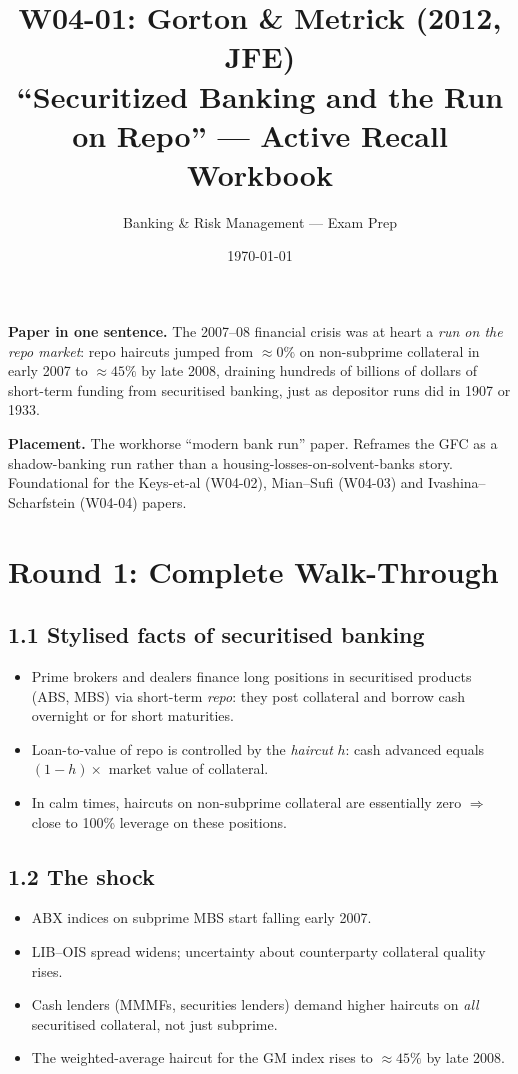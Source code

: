 \documentclass[11pt]{article}
\title{W04-01: Gorton \& Metrick (2012, JFE) \\
\large ``Securitized Banking and the Run on Repo'' --- Active Recall Workbook}
\author{Banking \& Risk Management --- Exam Prep}
\date{\today}
\begin{document}
\maketitle

\begin{keybox}
\textbf{Paper in one sentence.} The 2007--08 financial crisis was at heart a \emph{run on the repo market}: repo haircuts jumped from $\approx 0\%$ on non-subprime collateral in early 2007 to $\approx 45\%$ by late 2008, draining hundreds of billions of dollars of short-term funding from securitised banking, just as depositor runs did in 1907 or 1933.

\textbf{Placement.} The workhorse ``modern bank run'' paper. Reframes the GFC as a shadow-banking run rather than a housing-losses-on-solvent-banks story. Foundational for the Keys-et-al (W04-02), Mian--Sufi (W04-03) and Ivashina--Scharfstein (W04-04) papers.
\end{keybox}

\section*{Round 1: Complete Walk-Through}

\subsection*{1.1 Stylised facts of securitised banking}
\begin{itemize}
\item Prime brokers and dealers finance long positions in securitised products (ABS, MBS) via short-term \emph{repo}: they post collateral and borrow cash overnight or for short maturities.
\item Loan-to-value of repo is controlled by the \emph{haircut} $h$: cash advanced equals $(1-h)\times$ market value of collateral.
\item In calm times, haircuts on non-subprime collateral are essentially zero $\Rightarrow$ close to 100\% leverage on these positions.
\end{itemize}

\subsection*{1.2 The shock}
\begin{itemize}
\item ABX indices on subprime MBS start falling early 2007.
\item LIB--OIS spread widens; uncertainty about counterparty collateral quality rises.
\item Cash lenders (MMMFs, securities lenders) demand higher haircuts on \emph{all} securitised collateral, not just subprime.
\item The weighted-average haircut for the GM index rises to $\approx 45\%$ by late 2008.
\end{itemize}
\end{document}
